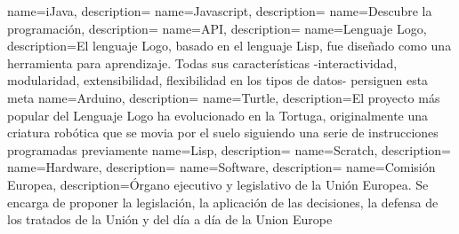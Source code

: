 
%





{
        name=iJava,
        description={}
}
{
        name=Javascript,
        description={}
}
{
        name=Descubre la programación,
        description={}
}
{
        name=API,
        description={}
}
{
        name=Lenguaje Logo,
        description={El lenguaje Logo, basado en el lenguaje Lisp, fue diseñado como una herramienta para aprendizaje. Todas sus características -interactividad, modularidad, extensibilidad, flexibilidad en los tipos de datos- persiguen esta meta}
}
{
        name=Arduino,
        description={}
}
{
        name=Turtle,
        description={El proyecto más popular del Lenguaje Logo ha evolucionado en la Tortuga, originalmente una criatura robótica que se movia por el suelo siguiendo una serie de instrucciones programadas previamente}
}
{
        name=Lisp,
        description={}
}
{
        name=Scratch,
        description={}
}
{
        name=Hardware,
        description={}
}
{
        name=Software,
        description={}
}
{
        name=Comisión Europea,
        description={Órgano ejecutivo y legislativo de la Unión Europea. Se encarga de proponer la legislación, la aplicación de las decisiones, la defensa de los tratados de la Unión y del día a día de la Union Europe}
}
